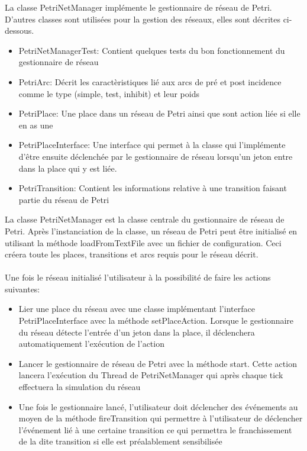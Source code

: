 \documentclass[11pt,a4paper, openany]{memoir}
\begin{document}
La classe PetriNetManager implémente le gestionnaire de réseau de Petri. D'autres classes sont utilisées pour la gestion des réseaux, elles sont décrites ci-dessous.\\
\begin{itemize}
\item PetriNetManagerTest: Contient quelques tests du bon fonctionnement du gestionnaire de réseau
\item PetriArc: Décrit les caractèristiques lié aux arcs de pré et post incidence comme le type (simple, test, inhibit) et leur poids
\item PetriPlace: Une place dans un réseau de Petri ainsi que sont action liée si elle en as une
\item PetriPlaceInterface: Une interface qui permet à la classe qui l'implémente d'être ensuite déclenchée par le gestionnaire de réseau lorsqu'un jeton entre dans la place qui y est liée.
\item PetriTransition: Contient les informations relative à une transition faisant partie du réseau de Petri\\
\end{itemize}
La classe PetriNetManager est la classe centrale du gestionnaire de réseau de Petri. Après l'instanciation de la classe, un réseau de Petri peut être initialisé en utilisant la méthode loadFromTextFile avec un fichier de configuration. Ceci créera toute les places, transitions et arcs requis pour le réseau décrit.\\\\
Une fois le réseau initialisé l'utilisateur à la possibilité de faire les actions suivantes:
\begin{itemize}
\item Lier une place du réseau avec une classe implémentant l'interface PetriPlaceInterface avec la méthode setPlaceAction. Lorsque le gestionnaire du réseau détecte l'entrée d'un jeton dans la place, il déclenchera automatiquement l'exécution de l'action
\item Lancer le gestionnaire de réseau de Petri avec la méthode start. Cette action lancera l'exécution du Thread de PetriNetManager qui après chaque tick effectuera la simulation du réseau
\item Une fois le gestionnaire lancé, l'utilisateur doit déclencher des événements au moyen de la méthode fireTransition qui permettre à l'utilisateur de déclencher l'événement lié à une certaine transition ce qui permettra le franchissement de la dite transition si elle est préalablement sensibilisée\\
\end{itemize}
\end{document}
